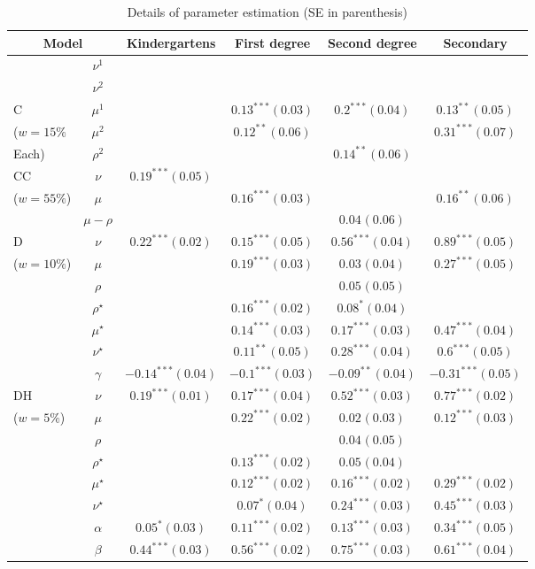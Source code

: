 \documentclass[fleqn,10pt]{wlscirep}
\begin{document}
\begin{table}
\begin{center}

\begin{tabular}{lc|cccc} \multicolumn{2}{c|}{Model}& Kindergartens & First degree & Second degree & Secondary \\ \hline 
&$\nu^1$&&&&\\
&$\nu^2$&&&&\\
C &$\mu^1$&& $0.13^{***}(0.03)$& $0.2^{***}(0.04)$& $0.13^{**}(0.05)$\\
($w=15\%$ &$\mu^2$&& $0.12^{**}(0.06)$&& $0.31^{***}(0.07)$\\ 
Each)  &$\rho^2$&&& $0.14^{**}(0.06)$&\\ \hline
CC &$\nu$& $0.19^{***}(0.05)$&&&\\
($w=55\%$) &$\mu$&& $0.16^{***}(0.03)$&& $0.16^{**}(0.06)$\\
&$\mu-\rho$&&& $0.04^{}(0.06)$&\\ \hline
D &$\nu$& $0.22^{***}(0.02)$& $0.15^{***}(0.05)$& $0.56^{***}(0.04)$& $0.89^{***}(0.05)$\\
($w=10\%$) &$\mu$&& $0.19^{***}(0.03)$& $0.03^{}(0.04)$& $0.27^{***}(0.05)$\\
&$\rho$&&& $0.05^{}(0.05)$&\\
&$\rho^\star$&& $0.16^{***}(0.02)$& $0.08^{*}(0.04)$&\\
&$\mu^\star$&& $0.14^{***}(0.03)$& $0.17^{***}(0.03)$& $0.47^{***}(0.04)$\\
&$\nu^\star$&& $0.11^{**}(0.05)$& $0.28^{***}(0.04)$& $0.6^{***}(0.05)$\\
&$\gamma$& $-0.14^{***}(0.04)$& $-0.1^{***}(0.03)$& $-0.09^{**}(0.04)$& $-0.31^{***}(0.05)$\\ \hline
DH&$\nu$& $0.19^{***}(0.01)$& $0.17^{***}(0.04)$& $0.52^{***}(0.03)$& $0.77^{***}(0.02)$\\
($w=5\%$) &$\mu$&& $0.22^{***}(0.02)$& $0.02^{}(0.03)$& $0.12^{***}(0.03)$\\
&$\rho$&&& $0.04^{}(0.05)$&\\
&$\rho^\star$&& $0.13^{***}(0.02)$& $0.05^{}(0.04)$&\\
&$\mu^\star$&& $0.12^{***}(0.02)$& $0.16^{***}(0.02)$& $0.29^{***}(0.02)$\\
&$\nu^\star$&& $0.07^{*}(0.04)$& $0.24^{***}(0.03)$& $0.45^{***}(0.03)$\\
&$\alpha$& $0.05^{*}(0.03)$& $0.11^{***}(0.02)$& $0.13^{***}(0.03)$& $0.34^{***}(0.05)$\\
&$\beta$& $0.44^{***}(0.03)$& $0.56^{***}(0.02)$& $0.75^{***}(0.03)$& $0.61^{***}(0.04)$\\
\end{tabular}



\caption{Details of parameter estimation (SE in parenthesis)}
\label{tab:params} 
\end{center}
\end{table}
\end{document}
